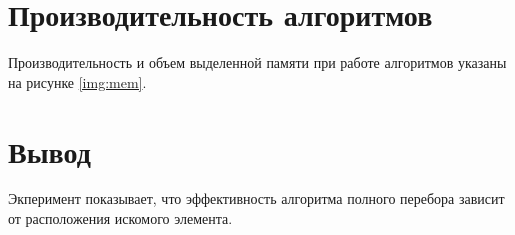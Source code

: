 \bigskip
\section{Производительность алгоритмов}

Производительность и объем выделенной памяти при работе алгоритмов указаны на рисунке \ref{img:mem}.


\section*{Вывод}

Экперимент показывает, что эффективность алгоритма полного перебора зависит от расположения искомого элемента.
